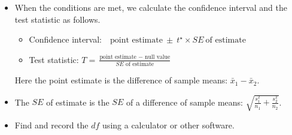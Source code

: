\begin{itemize}
\item When the conditions are met, we calculate the confidence interval and the test statistic as follows.  

\begin{itemize}
\setlength{\itemsep}{2mm}
\item[] Confidence interval:\ \  $\text{point estimate}\ \pm\ t^{\star} \times SE\ \text{of estimate}$
\item[] Test statistic:  $T = \frac{\text{point estimate } - \text{ null value}}{SE \text{ of estimate}}$ 
\end{itemize}
Here the point estimate is the difference of sample means: $\bar{x}_1-\bar{x}_2$.
\item[] The $SE$ of estimate is the $SE$ of a difference of sample means:  $\sqrt{\frac{s^2_1}{n_1}+\frac{s^2_2}{n_2}}$.
\item[] Find and record the $df$ using a calculator or other software.

\end{itemize}

{}

\reviewchapterheader{}

